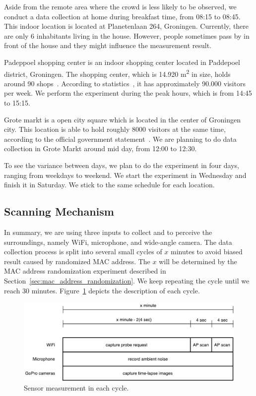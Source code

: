 Aside from the remote area where the crowd is less likely to be observed, we conduct a data collection at home during breakfast time, from 08:15 to 08:45. This indoor location is located at Planetenlaan 264, Groningen. Currently, there are only 6 inhabitants living in the house. However, people sometimes pass by in front of the house and they might influence the measurement result.

Padeppoel shopping center is an indoor shopping center located in Paddepoel district, Groningen. The shopping center, which is 14.920 m\textsuperscript{2} in size, holds around 90 shops~\cite{paddepoelstat}. According to statistics~\cite{paddepoelstat}, it has approximately 90.000 visitors per week. We perform the experiment during the peak hours, which is from 14:45 to 15:15.

Grote markt is a open city square which is located in the center of Groningen city. This location is able to hold roughly 8000 visitors at the same time, according to the official government statement~\cite{GemeenteGroningen2016}. We are planning to do data collection in Grote Markt around mid day, from 12:00 to 12:30.

To see the variance between days, we plan to do the experiment in four days, ranging from weekdays to weekend. We start the experiment in Wednesday and finish it in Saturday. We stick to the same schedule for each location.

\subsection{Scanning Mechanism} %
\label{sub:scanning}
In summary, we are using three inputs to collect and to perceive the surroundings, namely WiFi, microphone, and wide-angle camera. The data collection process is split into several small cycles of $x$ minutes to avoid biased result caused by randomized \ac{MAC} address. The $x$ will be determined by the \ac{MAC} address randomization experiment described in Section~\ref{sec:mac_address_randomization}. We keep repeating the cycle until we reach 30 minutes. Figure~\ref{fig:sensor-measurement} depicts the description of each cycle.

\begin{figure}[ht]
	\centering
	\includegraphics[width=\textwidth]{./img/3-scanning-mechanism}
	\caption{Sensor measurement in each cycle.}
	\label{fig:sensor-measurement}
\end{figure}

